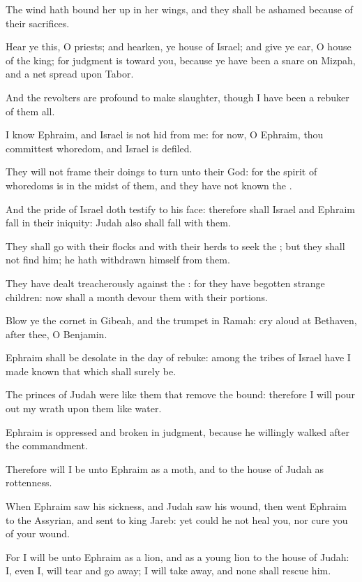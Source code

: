 \Verse The wind hath bound her up in her wings, and they shall be ashamed because of their sacrifices.


\Chapter
\Verse Hear ye this, O priests; and hearken, ye house of Israel; and give ye ear, O house of the king; for judgment is toward you, because ye have been a snare on Mizpah, and a net spread upon Tabor.

\Verse And the revolters are profound to make slaughter, though I have been a rebuker of them all.

\Verse I know Ephraim, and Israel is not hid from me: for now, O Ephraim, thou committest whoredom, and Israel is defiled.

\Verse They will not frame their doings to turn unto their God: for the spirit of whoredoms is in the midst of them, and they have not known the \LORD.

\Verse And the pride of Israel doth testify to his face: therefore shall Israel and Ephraim fall in their iniquity: Judah also shall fall with them.

\Verse They shall go with their flocks and with their herds to seek the \LORD; but they shall not find him; he hath withdrawn himself from them.

\Verse They have dealt treacherously against the \LORD: for they have begotten strange children: now shall a month devour them with their portions.

\Verse Blow ye the cornet in Gibeah, and the trumpet in Ramah: cry aloud at Bethaven, after thee, O Benjamin.

\Verse Ephraim shall be desolate in the day of rebuke: among the tribes of Israel have I made known that which shall surely be.

\Verse The princes of Judah were like them that remove the bound: therefore I will pour out my wrath upon them like water.

\Verse Ephraim is oppressed and broken in judgment, because he willingly walked after the commandment.

\Verse Therefore will I be unto Ephraim as a moth, and to the house of Judah as rottenness.

\Verse When Ephraim saw his sickness, and Judah saw his wound, then went Ephraim to the Assyrian, and sent to king Jareb: yet could he not heal you, nor cure you of your wound.

\Verse For I will be unto Ephraim as a lion, and as a young lion to the house of Judah: I, even I, will tear and go away; I will take away, and none shall rescue him.

